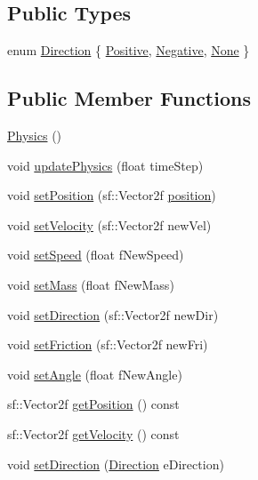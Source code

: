 \subsection*{Public Types}
\begin{DoxyCompactItemize}
\item 
enum \hyperlink{class_physics_a1a1b46dea83abe0c604a68e5445bc262}{Direction} \{ \hyperlink{class_physics_a1a1b46dea83abe0c604a68e5445bc262aee1222ec3203c2f189fb3d053b6ac4fc}{Positive}, 
\hyperlink{class_physics_a1a1b46dea83abe0c604a68e5445bc262a4563248323abfa601d3f612cea15aab9}{Negative}, 
\hyperlink{class_physics_a1a1b46dea83abe0c604a68e5445bc262afbf8fc5e7a2dab2acece07666c794ada}{None}
 \}
\end{DoxyCompactItemize}
\subsection*{Public Member Functions}
\begin{DoxyCompactItemize}
\item 
\hyperlink{class_physics_a4b2ebc0a344f04f48d227c72f0d0fbda}{Physics} ()
\item 
void \hyperlink{class_physics_a4191263a39bf65d69e90abe84801ea40}{update\+Physics} (float time\+Step)
\item 
void \hyperlink{class_physics_a74bcf0849c1fa84ac63b8b0a175cc886}{set\+Position} (sf\+::\+Vector2f \hyperlink{class_physics_a6087213b48f4754b6d69d94f0bc7606c}{position})
\item 
void \hyperlink{class_physics_ac7be95abda3d0c54bb8bb8f08854e2ae}{set\+Velocity} (sf\+::\+Vector2f new\+Vel)
\item 
void \hyperlink{class_physics_ad40c9ed00ca4051de0c94ac65405e700}{set\+Speed} (float f\+New\+Speed)
\item 
void \hyperlink{class_physics_ae5aef8654b224a3ea17cde032d8ea7b9}{set\+Mass} (float f\+New\+Mass)
\item 
void \hyperlink{class_physics_a123721942a1552796edd3c7c660779a2}{set\+Direction} (sf\+::\+Vector2f new\+Dir)
\item 
void \hyperlink{class_physics_a3869e0c4c8e23d5876f9b5b0cfdc7d2b}{set\+Friction} (sf\+::\+Vector2f new\+Fri)
\item 
void \hyperlink{class_physics_a659dfde50434b6fc3c70e51c06e1bca6}{set\+Angle} (float f\+New\+Angle)
\item 
sf\+::\+Vector2f \hyperlink{class_physics_aea92d796c2db1257df84dfed335a70fe}{get\+Position} () const 
\item 
sf\+::\+Vector2f \hyperlink{class_physics_a1f988396a60883b9a68b381f0210dfe0}{get\+Velocity} () const 
\item 
void \hyperlink{class_physics_a0122a4cac2428d85aa715ee5a6cb8170}{set\+Direction} (\hyperlink{class_physics_a1a1b46dea83abe0c604a68e5445bc262}{Direction} e\+Direction)
\end{DoxyCompactItemize}
